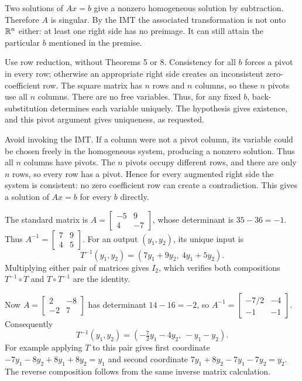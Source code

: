 Two solutions of $Ax=b$ give a nonzero homogeneous solution by subtraction.
Therefore $A$ is singular. By the IMT the associated transformation is
not onto $\mathbb{R}^n$ either: at least one right side has no preimage.
It can still attain the particular $b$ mentioned in the premise.

\goal Use row reduction, without Theorems 5 or 8.
Consistency for all $b$ forces a pivot in every row; otherwise an
appropriate right side creates an inconsistent zero-coefficient row.
The square matrix has $n$ rows and $n$ columns, so these $n$ pivots use
all $n$ columns. There are no free variables. Thus, for any fixed $b$,
back-substitution determines each variable uniquely. The hypothesis gives
existence, and this pivot argument gives uniqueness, as requested.

\goal Avoid invoking the IMT.
If a column were not a pivot column, its variable could be chosen freely
in the homogeneous system, producing a nonzero solution. Thus all $n$
columns have pivots. The $n$ pivots occupy different rows, and there are
only $n$ rows, so every row has a pivot. Hence for every augmented right
side the system is consistent: no zero coefficient row can create a
contradiction. This gives a solution of $Ax=b$ for every $b$ directly.

The standard matrix is
$A=\begin{bmatrix}-5&9\\4&-7\end{bmatrix}$, whose determinant is
$35-36=-1$. Thus
$A^{-1}=\begin{bmatrix}7&9\\4&5\end{bmatrix}$.
For an output $(y_1,y_2)$, its unique input is
\[
 \boxed{T^{-1}(y_1,y_2)=(7y_1+9y_2,\ 4y_1+5y_2)}.
\]
Multiplying either pair of matrices gives $I_2$, which verifies both
compositions $T^{-1}\circ T$ and $T\circ T^{-1}$ are the identity.

Now $A=\begin{bmatrix}2&-8\\-2&7\end{bmatrix}$ has determinant
$14-16=-2$, so
$A^{-1}=\begin{bmatrix}-7/2&-4\\-1&-1\end{bmatrix}$.
Consequently
\[
 \boxed{T^{-1}(y_1,y_2)=(-\tfrac72y_1-4y_2,\ -y_1-y_2)}.
\]
For example applying $T$ to this pair gives first coordinate
$-7y_1-8y_2+8y_1+8y_2=y_1$ and second coordinate
$7y_1+8y_2-7y_1-7y_2=y_2$. The reverse composition follows from the
same inverse matrix calculation.

